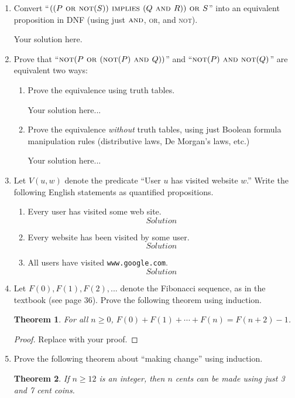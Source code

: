 \documentclass[11pt]{article}
\newtheorem{theorem}{Theorem}
\begin{document}
\begin{enumerate}
\item Convert ``$((P\textsc{ or not}(S))\textsc{ implies }
                  (Q\textsc{ and }R))\textsc{ or } S$''
  into an equivalent proposition in DNF (using just $\textsc{and}$,
  \textsc{or}, and \textsc{not}).
  
  Your solution here.

\item Prove that
  ``$\textsc{not}(P \textsc{ or } (\textsc{not}(P) \textsc{ and } Q))$''
  and
  ``$\textsc{not}(P) \textsc{ and not}(Q)$'' are equivalent two ways:
  \begin{enumerate}
  \item Prove the equivalence using truth tables.

    Your solution here...
    
  \item Prove the equivalence \emph{without} truth tables, using
      just Boolean formula manipulation rules (distributive laws, De
      Morgan's laws, etc.)

      Your solution here...
      
  \end{enumerate}
  
\item Let $V(u,w)$ denote the predicate ``User $u$ has visited website
  $w$.'' Write the following English statements as quantified
  propositions.
  \begin{enumerate}
  \item Every user has visited some web site.
    \[ Solution \]
  \item Every website has been visited by some user.
    \[ Solution \]
  \item All users have visited \texttt{www.google.com}.
    \[ Solution \]
  \end{enumerate}

\item Let $F(0), F(1), F(2), ...$ denote the Fibonacci sequence, as in
  the textbook (see page 36). Prove the following theorem using induction.
  \begin{theorem}
    For all $n\geq 0$, $F(0)+F(1)+\cdots + F(n) = F(n+2)-1$.
  \end{theorem}
  
  \begin{proof}
    Replace with your proof.
  \end{proof}

\item Prove the following theorem about ``making change'' using induction.
  \begin{theorem}
    If $n\geq 12$ is an integer,
    then $n$ cents can be made using just 3 and 7 cent coins.
  \end{theorem}
  

\end{enumerate}
\end{document}
